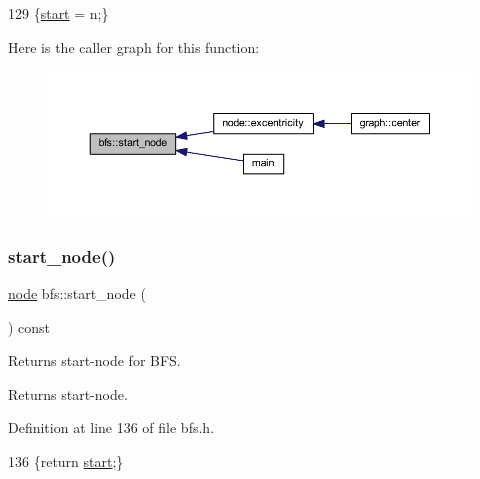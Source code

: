 \begin{DoxyCode}
129 \{\mbox{\hyperlink{classbfs_af2ab561d9e60a9fc2e25b02d1f807f96}{start}} = n;\}
\end{DoxyCode}
Here is the caller graph for this function\+:
\nopagebreak
\begin{figure}[H]
\begin{center}
\leavevmode
\includegraphics[width=350pt]{classbfs_a23e2981c2ee617a6e12a8833d2db6210_icgraph}
\end{center}
\end{figure}
\mbox{\label{classbfs_afac59b4a0d92449d8fa46a202b11ae4b}} 
\subsubsection{\texorpdfstring{start\+\_\+node()}{start\_node()}\hspace{0.1cm}{\footnotesize\ttfamily [2/2]}}
{\footnotesize\ttfamily \mbox{\hyperlink{classnode}{node}} bfs\+::start\+\_\+node (\begin{DoxyParamCaption}{ }\end{DoxyParamCaption}) const\hspace{0.3cm}{\ttfamily [inline]}}



Returns start-\/node for B\+FS. 

\begin{DoxyReturn}{Returns}
start-\/node. 
\end{DoxyReturn}


Definition at line 136 of file bfs.\+h.


\begin{DoxyCode}
136 \{\textcolor{keywordflow}{return} \mbox{\hyperlink{classbfs_af2ab561d9e60a9fc2e25b02d1f807f96}{start}};\}
\end{DoxyCode}
\mbox{\label{classbfs_a7de47b820fb9532f497660f767c9457f}} 
